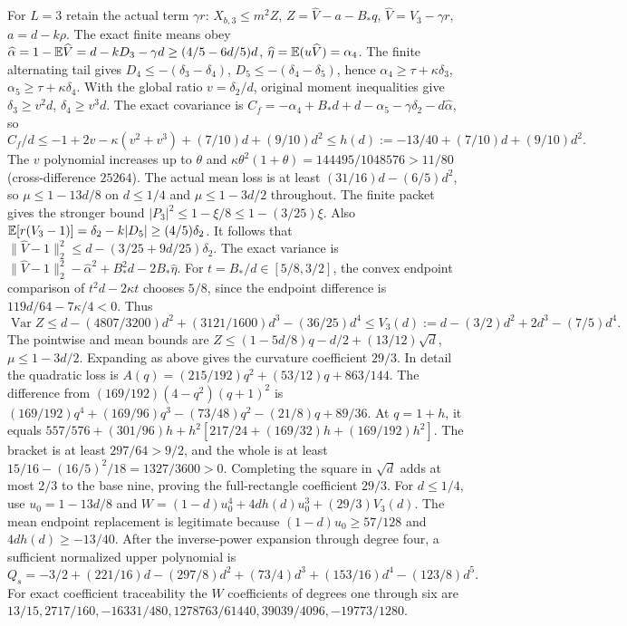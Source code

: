 For $L=3$ retain the actual term $\gamma r$:
$X_{b,3}\le m^2Z$,
$Z=\widehat V-a-B_*q$, $\widehat V=V_3-\gamma r$,
$a=d-k\rho$.
The exact finite means obey
$\widehat\alpha=1-\mathbb E\widehat V=d-kD_3-\gamma d
\ge(4/5-6d/5)d$, $\widehat\eta=\mathbb E(u\widehat V)=\alpha_4$.
The finite alternating tail gives
$D_4\le-(\delta_3-\delta_4)$,
$D_5\le-(\delta_4-\delta_5)$, hence
$\alpha_4\ge\tau+\kappa\delta_3$,
$\alpha_5\ge\tau+\kappa\delta_4$.
With the global ratio $v=\delta_2/d$, original moment inequalities
give $\delta_3\ge v^2d$, $\delta_4\ge v^3d$.
The exact covariance is
$C_f=-\alpha_4+B_*d+d-\alpha_5-\gamma\delta_2-d\widehat\alpha$,
so
\[
C_f/d\le-1+2v-\kappa(v^2+v^3)+(7/10)d+(9/10)d^2
\le h(d):=-13/40+(7/10)d+(9/10)d^2.
\]
The $v$ polynomial increases up to $\theta$ and
$\kappa\theta^2(1+\theta)=144495/1048576>11/80$ (cross-difference
$25264$). The actual mean loss is at least
$(31/16)d-(6/5)d^2$, so $\mu\le1-13d/8$ on $d\le1/4$ and
$\mu\le1-3d/2$ throughout.
The finite packet gives the stronger bound
\(|P_3|^2\le1-\xi/8\le1-(3/25)\xi\).
Also $\mathbb E[r(V_3-1)]=\delta_2-k|D_5|\ge(4/5)\delta_2$.
It follows that
$\|\widehat V-1\|_2^2\le d-(3/25+9d/25)\delta_2$.
The exact variance is
$\|\widehat V-1\|_2^2-\widehat\alpha^2+B_*^2d-2B_*\widehat\eta$.
For $t=B_*/d\in[5/8,3/2]$, the convex endpoint comparison of
$t^2d-2\kappa t$ chooses $5/8$, since the endpoint difference is
$119d/64-7\kappa/4<0$.
Thus
\[
\operatorname{Var}Z\le d-(4807/3200)d^2+(3121/1600)d^3-(36/25)d^4
\le V_3(d):=d-(3/2)d^2+2d^3-(7/5)d^4.
\]
The pointwise and mean bounds are
$Z\le(1-5d/8)q-d/2+(13/12)\sqrt d$, $\mu\le1-3d/2$.
Expanding as above gives the curvature coefficient $29/3$.
In detail the quadratic loss is
$A(q)=(215/192)q^2+(53/12)q+863/144$.
The difference from $(169/192)(4-q^2)(q+1)^2$ is
$(169/192)q^4+(169/96)q^3-(73/48)q^2-(21/8)q+89/36$.
At $q=1+h$, it equals
$557/576+(301/96)h+h^2[217/24+(169/32)h+(169/192)h^2]$.
The bracket is at least $297/64>9/2$, and the whole is at least
$15/16-(16/5)^2/18=1327/3600>0$.
Completing the square in $\sqrt d$ adds at most $2/3$ to the base
nine, proving the full-rectangle coefficient $29/3$.
For $d\le1/4$, use $u_0=1-13d/8$ and
$W=(1-d)u_0^4+4dh(d)u_0^3+(29/3)V_3(d)$.
The mean endpoint replacement is legitimate because
$(1-d)u_0\ge57/128$ and $4dh(d)\ge-13/40$.
After the inverse-power expansion through degree four, a sufficient
normalized upper polynomial is
\[
Q_s=-3/2+(221/16)d-(297/8)d^2+(73/4)d^3
+(153/16)d^4-(123/8)d^5.
\]
For exact coefficient traceability the $W$ coefficients of degrees
one through six are
$13/15,\allowbreak 2717/160,\allowbreak -16331/480,\allowbreak 1278763/61440,\allowbreak 39039/4096,\allowbreak -19773/1280$.
